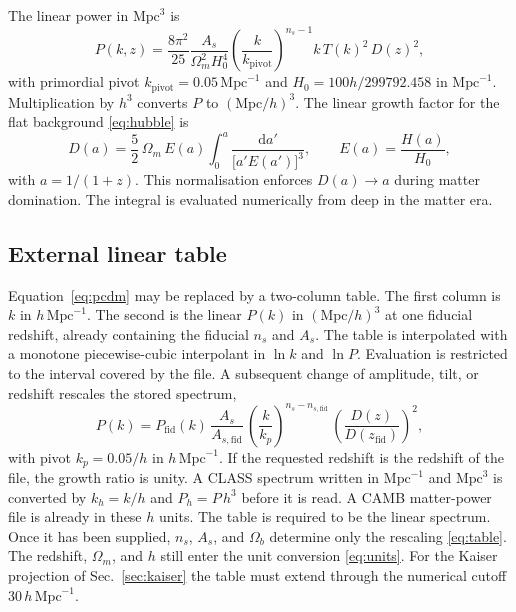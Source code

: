\documentclass[11pt]{article}
\begin{document}
The linear power in $\mathrm{Mpc}^{3}$ is
\begin{equation}
\label{eq:pcdm}
P(k,z)
=
\frac{8\pi^{2}}{25}
\frac{A_s}{\Omega_m^{2} H_0^{4}}
\left(\frac{k}{k_\mathrm{pivot}}\right)^{n_s-1}
k\,T(k)^{2}\,D(z)^{2},
\end{equation}
with primordial pivot $k_\mathrm{pivot}=0.05\,\mathrm{Mpc}^{-1}$ and $H_0 = 100h/299792.458$ in $\mathrm{Mpc}^{-1}$.
Multiplication by $h^{3}$ converts $P$ to $(\mathrm{Mpc}/h)^{3}$.
The linear growth factor for the flat background \eqref{eq:hubble} is
\begin{equation}
\label{eq:growth}
D(a)
=
\frac{5}{2}\,\Omega_m\,E(a)
\int_{0}^{a}
\frac{\mathrm{d}a'}{\bigl[a' E(a')\bigr]^{3}},
\qquad
E(a)=\frac{H(a)}{H_0},
\end{equation}
with $a=1/(1+z)$.
This normalisation enforces $D(a)\to a$ during matter domination.
The integral is evaluated numerically from deep in the matter era.

\subsection{External linear table}
\label{sec:table}

Equation~\eqref{eq:pcdm} may be replaced by a two-column table.
The first column is $k$ in $h\,\mathrm{Mpc}^{-1}$.
The second is the linear $P(k)$ in $(\mathrm{Mpc}/h)^{3}$ at one fiducial redshift, already containing the fiducial $n_s$ and $A_s$.
The table is interpolated with a monotone piecewise-cubic interpolant in $\ln k$ and $\ln P$.
Evaluation is restricted to the interval covered by the file.
A subsequent change of amplitude, tilt, or redshift rescales the stored spectrum,
\begin{equation}
\label{eq:table}
P(k)
=
P_\mathrm{fid}(k)\,
\frac{A_s}{A_{s,\mathrm{fid}}}\,
\left(\frac{k}{k_p}\right)^{n_s-n_{s,\mathrm{fid}}}\,
\left(\frac{D(z)}{D(z_\mathrm{fid})}\right)^{2},
\end{equation}
with pivot $k_p = 0.05/h$ in $h\,\mathrm{Mpc}^{-1}$.
If the requested redshift is the redshift of the file, the growth ratio is unity.
A CLASS spectrum written in $\mathrm{Mpc}^{-1}$ and $\mathrm{Mpc}^{3}$ is converted by $k_h=k/h$ and $P_h = P\,h^{3}$ before it is read.
A CAMB matter-power file is already in these $h$ units.
The table is required to be the linear spectrum.
Once it has been supplied, $n_s$, $A_s$, and $\Omega_b$ determine only the rescaling \eqref{eq:table}.
The redshift, $\Omega_m$, and $h$ still enter the unit conversion \eqref{eq:units}.
For the Kaiser projection of Sec.~\ref{sec:kaiser} the table must extend through the numerical cutoff $30\,h\,\mathrm{Mpc}^{-1}$.
\end{document}
